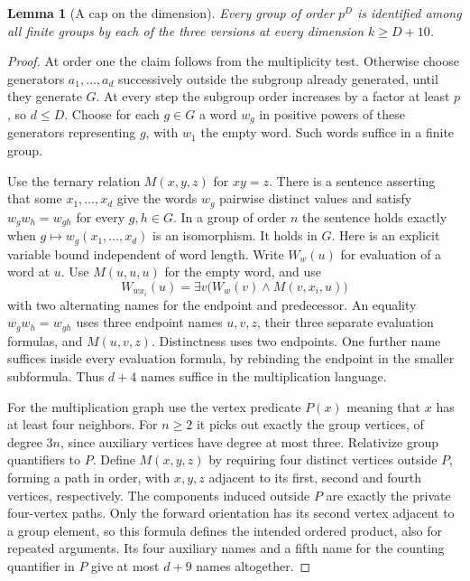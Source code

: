 \documentclass[11pt]{article}
\newtheorem{lemma}[theorem]{Lemma}
\theoremstyle{definition}
\theoremstyle{remark}
\numberwithin{equation}{section}
\begin{document}
\begin{lemma}[A cap on the dimension]
\label{hu:cap}
Every group of order $p^D$ is identified among all finite groups by
each of the three versions at every dimension $k\ge D+10$.
\end{lemma}
\begin{proof}
At order one the claim follows from the multiplicity test. Otherwise
choose generators $a_1,\ldots,a_d$ successively outside the subgroup
already generated, until they generate $G$. At every step the
subgroup order increases by a factor at least $p$, so $d\le D$.
Choose for each $g\in G$ a word $w_g$ in positive powers of these
generators representing $g$, with $w_1$ the empty word. Such words
suffice in a finite group.

Use the ternary relation $M(x,y,z)$ for $xy=z$. There is a sentence
asserting that some $x_1,\ldots,x_d$ give the words $w_g$ pairwise
distinct values and satisfy $w_gw_h=w_{gh}$ for every $g,h\in G$.
In a group of order $n$ the sentence holds exactly when
$g\mapsto w_g(x_1,\ldots,x_d)$ is an isomorphism. It holds in $G$.
Here is an explicit variable bound independent of word length.
Write $W_w(u)$ for evaluation of a word at $u$. Use $M(u,u,u)$ for
the empty word, and use
\[
 W_{w x_i}(u)=\exists v\bigl(W_w(v)\land M(v,x_i,u)\bigr)
\]
with two alternating names for the endpoint and predecessor. An
equality $w_gw_h=w_{gh}$ uses three endpoint names $u,v,z$, their
three separate evaluation formulas, and $M(u,v,z)$. Distinctness
uses two endpoints. One further name suffices inside every evaluation
formula, by rebinding the endpoint in the smaller subformula. Thus
$d+4$ names suffice in the multiplication language.

For the multiplication graph use the vertex predicate $P(x)$ meaning
that $x$ has at least four neighbors. For $n\ge2$ it picks out exactly
the group vertices, of degree $3n$, since auxiliary vertices have
degree at most three. Relativize group quantifiers to $P$. Define
$M(x,y,z)$ by requiring four distinct vertices outside $P$, forming
a path in order, with $x,y,z$ adjacent to its first, second and
fourth vertices, respectively. The components induced outside $P$
are exactly the private four-vertex paths. Only the forward
orientation has its second vertex adjacent to a group element, so
this formula defines the intended ordered product, also for repeated
arguments. Its four auxiliary names and a fifth name for the
counting quantifier in $P$ give at most $d+9$ names altogether.


\end{proof}
\end{document}
